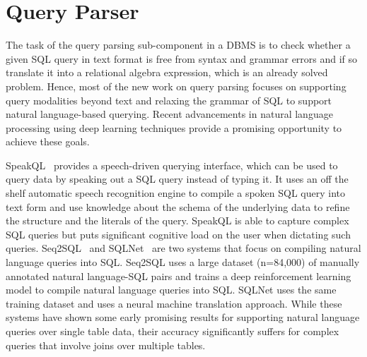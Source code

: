 \section{Query Parser}
The task of the query parsing sub-component in a DBMS is to check whether a given SQL query in text format is free from syntax and grammar errors and if so translate it into a relational algebra expression, which is an already solved problem.
Hence, most of the new work on query parsing focuses on supporting query modalities beyond text and relaxing the grammar of SQL to support natural language-based querying.
Recent advancements in natural language processing using deep learning techniques provide a promising opportunity to achieve these goals.

SpeakQL~\cite{speakql} provides a speech-driven querying interface, which can be used to query data by speaking out a SQL query instead of typing it.
It uses an off the shelf automatic speech recognition engine to compile a spoken SQL query into text form and use knowledge about the schema of the underlying data to refine the structure and the literals of the query.
SpeakQL is able to capture complex SQL queries but puts significant cognitive load on the user when dictating such queries.
Seq2SQL~\cite{seq2sql} and SQLNet~\cite{sqlnet} are two systems that focus on compiling natural language queries into SQL.
Seq2SQL uses a large dataset (n=84,000) of manually annotated natural language-SQL pairs and trains a deep reinforcement learning model to compile natural language queries into SQL.
SQLNet uses the same training dataset and uses a neural machine translation approach.
While these systems have shown some early promising results for supporting natural language queries over single table data, their accuracy significantly suffers for complex queries that involve joins over multiple tables.
